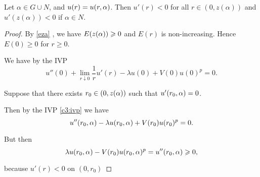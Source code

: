 \begin{lemma}\label{genlem2}
Let $\alpha \in G \cup N$, and $u(r) = u(r, \alpha)$. Then $u'(r) < 0$ for all
$r \in (0, z(\alpha))$ and $u'(z(\alpha)) < 0$ if $\alpha \in N$.
\end{lemma}
\begin{proof}
By \cref{eza} 
, we have $E(z(\alpha)) \geqslant 0$ and $E(r)$ is non-increasing. 
Hence $E(0) \geq 0$ for $r \geq 0$.

We have by the IVP 
\[ u''(0) + \underset{r \downarrow 0}{\lim} \frac{1}{r} u'(r) -
\lambda u(0) + V(0) u(0)^p = 0. \]

Suppose that there exists $r_0 \in (0,z(\alpha))$ such that $u'(r_0, \alpha)=0$.

Then by the {\red IVP} \eqref{c3:ivp} we have 
\[ u''(r_0, \alpha) - \lambda u(r_0, \alpha) + V(r_0) u(r_0)^p = 0. \]

But then 
\[ \lambda u(r_0,\alpha) - V(r_0) u(r_0,\alpha)^p = u''(r_0, \alpha) \geqslant 0, \]

because $u'(r) < 0$ on $(0, r_0)$
\end{proof}


